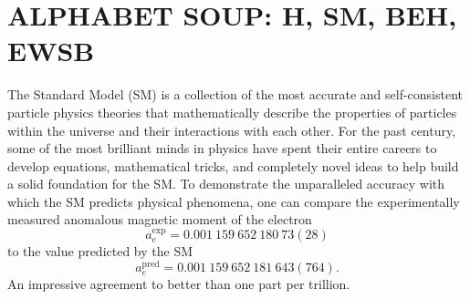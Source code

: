 \chapter{ALPHABET SOUP: H, SM, BEH, EWSB}
\label{ch:theory}

The Standard Model (SM) is a collection of the most accurate and self-consistent particle physics theories that mathematically describe the properties of particles within the universe and their interactions with each other.
For the past century, some of the most brilliant minds in physics have spent their entire careers to develop equations, mathematical tricks, and completely novel ideas to help build a solid foundation for the SM.
To demonstrate the unparalleled accuracy with which the SM predicts physical phenomena, one can compare the experimentally measured anomalous magnetic moment of the electron
\begin{equation*}
    a_e^{\mathrm{exp}} = 0.001\ 159\ 652\ 180\ 73(28)
\end{equation*}
to the value predicted by the SM
\begin{equation*}
    a_e^{\mathrm{pred}} = 0.001\ 159\ 652\ 181\ 643(764).
\end{equation*}
An impressive agreement to better than one part per trillion.

